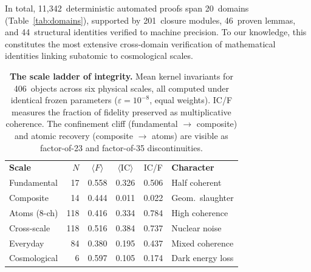 \documentclass[
  aps,
  prx,
  twocolumn,
  superscriptaddress,
  nofootinbib,
  floatfix
]{revtex4-2}
\newcommand{\eps}{\varepsilon}
\newcommand{\IC}{\mathrm{IC}}
\begin{document}
In total, 11{,}342~deterministic automated proofs span
20~domains (Table~\ref{tab:domains}), supported by
201~closure modules, 46~proven lemmas, and 44~structural
identities verified to machine precision. To our knowledge,
this constitutes the most extensive cross-domain verification
of mathematical identities linking subatomic to cosmological
scales.

\begin{table}[!htbp]
\caption{\textbf{The scale ladder of integrity.} Mean kernel
invariants for 406~objects across six physical scales, all computed
under identical frozen parameters
($\eps = 10^{-8}$, equal weights). IC/F measures the fraction of
fidelity preserved as multiplicative coherence. The confinement cliff
(fundamental $\to$ composite) and atomic recovery (composite $\to$
atoms) are visible as factor-of-23 and factor-of-35 discontinuities.}
\label{tab:scales}
\begin{ruledtabular}
\begin{tabular}{lrcccl}
\textbf{Scale} & $N$ & $\langle F\rangle$ & $\langle\IC\rangle$
  & IC/F & \textbf{Character} \\
\colrule
Fundamental   &  17 & 0.558 & 0.326 & 0.506 & Half coherent \\
Composite     &  14 & 0.444 & 0.011 & 0.022 & \textcolor{CliffRed}{Geom.\ slaughter} \\
Atoms (8-ch)  & 118 & 0.416 & 0.334 & 0.784 & \textcolor{HealGreen}{High coherence} \\
Cross-scale   & 118 & 0.516 & 0.384 & 0.737 & Nuclear noise \\
Everyday      &  84 & 0.380 & 0.195 & 0.437 & Mixed coherence \\
Cosmological  &   6 & 0.597 & 0.105 & 0.174 & Dark energy loss \\
\end{tabular}
\end{ruledtabular}
\end{table}
\end{document}
